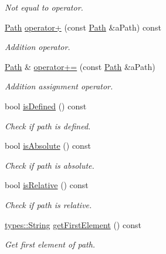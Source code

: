 \begin{DoxyCompactItemize}
\begin{DoxyCompactList}\small\item\em Not equal to operator. \end{DoxyCompactList}\item 
\hyperlink{classlibrary_1_1core_1_1fs_1_1_path}{Path} \hyperlink{classlibrary_1_1core_1_1fs_1_1_path_a3f86a7054939a51f44b2f5a796470071}{operator+} (const \hyperlink{classlibrary_1_1core_1_1fs_1_1_path}{Path} \&a\+Path) const
\begin{DoxyCompactList}\small\item\em Addition operator. \end{DoxyCompactList}\item 
\hyperlink{classlibrary_1_1core_1_1fs_1_1_path}{Path} \& \hyperlink{classlibrary_1_1core_1_1fs_1_1_path_a3fae713dbf257fdcec2fdb2ec6c27256}{operator+=} (const \hyperlink{classlibrary_1_1core_1_1fs_1_1_path}{Path} \&a\+Path)
\begin{DoxyCompactList}\small\item\em Addition assignment operator. \end{DoxyCompactList}\item 
bool \hyperlink{classlibrary_1_1core_1_1fs_1_1_path_a4315cfd12f61bf477e010f33122c3d0c}{is\+Defined} () const
\begin{DoxyCompactList}\small\item\em Check if path is defined. \end{DoxyCompactList}\item 
bool \hyperlink{classlibrary_1_1core_1_1fs_1_1_path_a9a5772dfc1273a74137ca301e9a84d61}{is\+Absolute} () const
\begin{DoxyCompactList}\small\item\em Check if path is absolute. \end{DoxyCompactList}\item 
bool \hyperlink{classlibrary_1_1core_1_1fs_1_1_path_a97cf61b699efe17e23ac3a91daf897e2}{is\+Relative} () const
\begin{DoxyCompactList}\small\item\em Check if path is relative. \end{DoxyCompactList}\item 
\hyperlink{classlibrary_1_1core_1_1types_1_1_string}{types\+::\+String} \hyperlink{classlibrary_1_1core_1_1fs_1_1_path_a431c7842c8a0d5fc314b676a8487e5af}{get\+First\+Element} () const
\begin{DoxyCompactList}\small\item\em Get first element of path. \end{DoxyCompactList}\item 

\end{DoxyCompactItemize}

